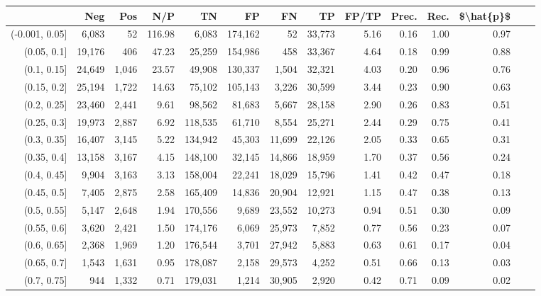 \begin{tabular}{rrrrrrrrrrrrrr}
\toprule
{} &     Neg &    Pos &     N/P &       TN &       FP &      FN &      TP & FP/TP & Prec. &  Rec. & \$\textbackslash hat\{p\}\$ \\
\midrule
(-0.001, 0.05] &   6,083 &     52 &  116.98 &    6,083 &  174,162 &      52 &  33,773 &  5.16 &  0.16 &  1.00 &      0.97 \\
(0.05, 0.1]    &  19,176 &    406 &   47.23 &   25,259 &  154,986 &     458 &  33,367 &  4.64 &  0.18 &  0.99 &      0.88 \\
(0.1, 0.15]    &  24,649 &  1,046 &   23.57 &   49,908 &  130,337 &   1,504 &  32,321 &  4.03 &  0.20 &  0.96 &      0.76 \\
(0.15, 0.2]    &  25,194 &  1,722 &   14.63 &   75,102 &  105,143 &   3,226 &  30,599 &  3.44 &  0.23 &  0.90 &      0.63 \\
(0.2, 0.25]    &  23,460 &  2,441 &    9.61 &   98,562 &   81,683 &   5,667 &  28,158 &  2.90 &  0.26 &  0.83 &      0.51 \\
(0.25, 0.3]    &  19,973 &  2,887 &    6.92 &  118,535 &   61,710 &   8,554 &  25,271 &  2.44 &  0.29 &  0.75 &      0.41 \\
(0.3, 0.35]    &  16,407 &  3,145 &    5.22 &  134,942 &   45,303 &  11,699 &  22,126 &  2.05 &  0.33 &  0.65 &      0.31 \\
(0.35, 0.4]    &  13,158 &  3,167 &    4.15 &  148,100 &   32,145 &  14,866 &  18,959 &  1.70 &  0.37 &  0.56 &      0.24 \\
(0.4, 0.45]    &   9,904 &  3,163 &    3.13 &  158,004 &   22,241 &  18,029 &  15,796 &  1.41 &  0.42 &  0.47 &      0.18 \\
(0.45, 0.5]    &   7,405 &  2,875 &    2.58 &  165,409 &   14,836 &  20,904 &  12,921 &  1.15 &  0.47 &  0.38 &      0.13 \\
(0.5, 0.55]    &   5,147 &  2,648 &    1.94 &  170,556 &    9,689 &  23,552 &  10,273 &  0.94 &  0.51 &  0.30 &      0.09 \\
(0.55, 0.6]    &   3,620 &  2,421 &    1.50 &  174,176 &    6,069 &  25,973 &   7,852 &  0.77 &  0.56 &  0.23 &      0.07 \\
(0.6, 0.65]    &   2,368 &  1,969 &    1.20 &  176,544 &    3,701 &  27,942 &   5,883 &  0.63 &  0.61 &  0.17 &      0.04 \\
(0.65, 0.7]    &   1,543 &  1,631 &    0.95 &  178,087 &    2,158 &  29,573 &   4,252 &  0.51 &  0.66 &  0.13 &      0.03 \\
(0.7, 0.75]    &     944 &  1,332 &    0.71 &  179,031 &    1,214 &  30,905 &   2,920 &  0.42 &  0.71 &  0.09 &      0.02 \\

\end{tabular}
